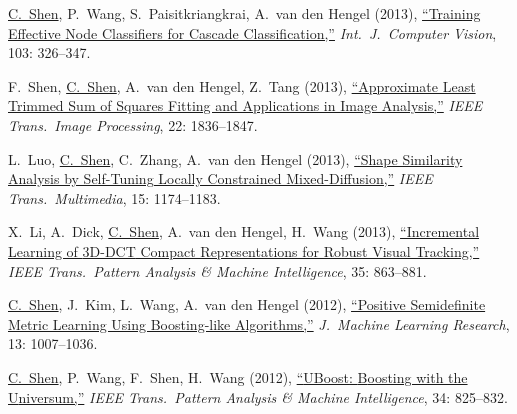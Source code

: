 \documentclass[9pt, a4paper]{article}
\newcommand{\years}[1]{\marginnote{\scriptsize #1}}
\def\highlight{\uline}
\begin{document}
\years{2013} \highlight{C.~Shen}, P.~Wang, S.~Paisitkriangkrai, A.~van den Hengel (2013),
\href{http://www.google.com/search?lr=&ie=UTF-8&oe=UTF-8&q=Training+Effective+Node+Classifiers+for+Cascade+Classification+Chunhua+Shen%2C+Peng+Wang%2C+Sakrapee+Paisitkriangkrai%2C+Anton+van+den+Hengel}{``Training Effective Node Classifiers for Cascade Classification,{}''}
\emph{Int.\ J.\  Computer Vision}, 103: 326--347.

\medskip

\years{2013} F.~Shen, \highlight{C.~Shen}, A.~van den Hengel, Z.~Tang (2013),
\href{http://www.google.com/search?lr=&ie=UTF-8&oe=UTF-8&q=Approximate+Least+Trimmed+Sum+of+Squares+Fitting+and+Applications+in+Image+Analysis+Fumin+Shen%2C+Chunhua+Shen%2C+Anton+van+den+Hengel%2C+Zhenmin+Tang}{``Approximate Least Trimmed Sum of Squares Fitting and Applications in Image Analysis,{}''}
\emph{IEEE Trans.\  Image Processing}, 22: 1836--1847.

\medskip

\years{2013} L.~Luo, \highlight{C.~Shen}, C.~Zhang, A.~van den Hengel (2013),
\href{http://www.google.com/search?lr=&ie=UTF-8&oe=UTF-8&q=Shape+Similarity+Analysis+by+Self-Tuning+Locally+Constrained+Mixed-Diffusion+Lei+Luo%2C+Chunhua+Shen%2C+Chunyuan+Zhang%2C+Anton+van+den+Hengel}{``Shape Similarity Analysis by Self-Tuning Locally Constrained Mixed-Diffusion,{}''}
\emph{IEEE Trans.\  Multimedia}, 15: 1174--1183.

\medskip

\years{2013} X.~Li, A.~Dick, \highlight{C.~Shen}, A.~van den Hengel, H.~Wang (2013),
\href{http://www.google.com/search?lr=&ie=UTF-8&oe=UTF-8&q=Incremental+Learning+of+3D-DCT+Compact+Representations+for+Robust+Visual+Tracking+Xi+Li%2C+Anthony+Dick%2C+Chunhua+Shen%2C+Anton+van+den+Hengel%2C+Hanzi+Wang}{``Incremental Learning of {3D-DCT} Compact Representations for Robust Visual Tracking,{}''}
\emph{IEEE Trans.\  Pattern Analysis \& Machine Intelligence}, 35: 863--881.

\medskip

\years{2012} \highlight{C.~Shen}, J.~Kim, L.~Wang, A.~van den Hengel (2012),
\href{http://www.google.com/search?lr=&ie=UTF-8&oe=UTF-8&q=Positive+Semidefinite+Metric+Learning+Using+Boosting-like+Algorithms+Chunhua+Shen%2C+Junae+Kim%2C+Lei+Wang%2C+Anton+van+den+Hengel}{``Positive Semidefinite Metric Learning Using Boosting-like Algorithms,{}''}
\emph{J.\  Machine Learning Research}, 13: 1007--1036.

\medskip

\years{2012} \highlight{C.~Shen}, P.~Wang, F.~Shen, H.~Wang (2012),
\href{http://www.google.com/search?lr=&ie=UTF-8&oe=UTF-8&q=UBoost%3A+Boosting+with+the+Universum+Chunhua+Shen%2C+Peng+Wang%2C+Fumin+Shen%2C+Hanzi+Wang}{``{UBoost}: {B}oosting with the {U}niversum,{}''}
\emph{IEEE Trans.\  Pattern Analysis \& Machine Intelligence}, 34: 825--832.
\end{document}
